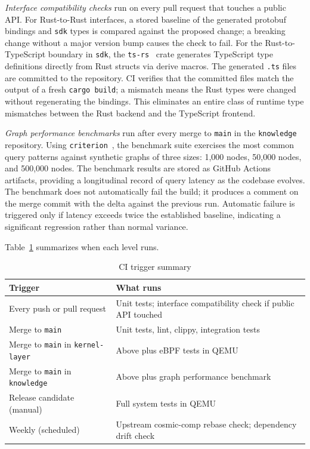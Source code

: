 \emph{Interface compatibility checks} run on every pull request that touches
a public API. For Rust-to-Rust interfaces, a stored baseline of the generated
protobuf bindings and \texttt{sdk} types is compared against the proposed
change; a breaking change without a major version bump causes the check to
fail. For the Rust-to-TypeScript boundary in \texttt{sdk}, the
\texttt{ts-rs}~\cite{ts-rs} crate generates TypeScript type definitions
directly from Rust structs via derive macros. The generated \texttt{.ts} files
are committed to the repository. CI verifies that the committed files match
the output of a fresh \texttt{cargo build}; a mismatch means the Rust types
were changed without regenerating the bindings. This eliminates an entire
class of runtime type mismatches between the Rust backend and the TypeScript
frontend.

\emph{Graph performance benchmarks} run after every merge to \texttt{main}
in the \texttt{knowledge} repository. Using \texttt{criterion}~\cite{criterion},
the benchmark suite exercises the most common query patterns against synthetic
graphs of three sizes: 1,000 nodes, 50,000 nodes, and 500,000 nodes. The
benchmark results are stored as GitHub Actions artifacts, providing a
longitudinal record of query latency as the codebase evolves. The benchmark
does not automatically fail the build; it produces a comment on the merge
commit with the delta against the previous run. Automatic failure is triggered
only if latency exceeds twice the established baseline, indicating a
significant regression rather than normal variance.

Table~\ref{tab:ci-triggers} summarizes when each level runs.

\begin{table}[htbp]
\caption{CI trigger summary}
\label{tab:ci-triggers}
\begin{tabularx}{\linewidth}{lX}
\toprule
\textbf{Trigger} & \textbf{What runs} \\
\midrule
Every push or pull request     & Unit tests; interface compatibility check if public API touched \\
Merge to \texttt{main}         & Unit tests, lint, clippy, integration tests \\
Merge to \texttt{main} in \texttt{kernel-layer} & Above plus eBPF tests in QEMU \\
Merge to \texttt{main} in \texttt{knowledge}    & Above plus graph performance benchmark \\
Release candidate (manual)     & Full system tests in QEMU \\
Weekly (scheduled)             & Upstream cosmic-comp rebase check; dependency drift check \\
\bottomrule
\end{tabularx}
\end{table}

